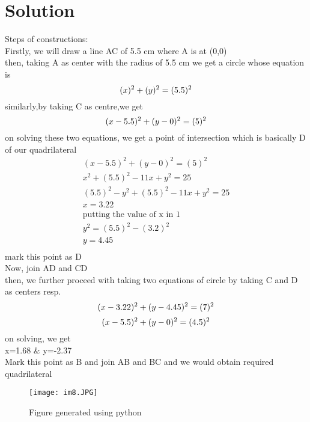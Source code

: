 \documentclass{article}
\begin{document}
\section*{Solution}
Steps of constructions:\\
Firstly, we will draw a line AC of 5.5 cm where A is at (0,0)\\
then, taking A as center with the radius of 5.5 cm we get a circle whose equation is\\
\begin{equation}
    (x)^{2}+(y)^{2}=(5.5)^{2}\\
\end{equation}
similarly,by taking C as centre,we get\\
\begin{equation}
    (x-5.5)^{2}+(y-0)^{2}=(5)^{2}\\
\end{equation}
on solving these two equations, we get a point of intersection which is basically D of our quadrilateral\\
\begin{gather*}
    (x-5.5)^{2}+(y-0)^{2}=(5)^{2}\\
    x^{2}+(5.5)^2-11x + y^{2}=25\\
    (5.5)^2-y^{2}+(5.5)^2-11x+y^{2}=25\\
    x=3.22\\
    \mbox{putting the value of x in 1}\\
    y^{2}=(5.5)^{2}-(3.2)^{2}\\
    y=4.45\\
\end{gather*}
mark this point as D\\
Now, join AD and CD\\
then, we further proceed with taking two equations of circle by taking C and D as centers resp.\\
\begin{equation}
    (x-3.22)^{2}+(y-4.45)^{2}=(7)^{2}\\
\end{equation}
\begin{equation}
    (x-5.5)^{2}+(y-0)^{2}=(4.5)^{2}\\
\end{equation}
on solving, we get\\
x=1.68 & y=-2.37\\
Mark this point as B and join AB and BC and we would obtain required quadrilateral\\
\begin{figure}[h!]
    \centering
    \texttt{[image: im8.JPG]}
    \caption{Figure generated using python}
    \label{fig:my_label}
\end{figure}
\end{document}
